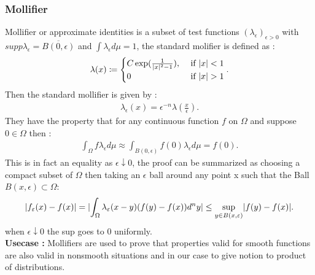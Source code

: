 \subsubsection{Mollifier}
Mollifier or approximate identities is a subset of test functions $(\lambda_{\epsilon })_{\epsilon  > 0}$ with 
$supp \lambda_\epsilon  = \overline{B(0,\epsilon )}$ and $\int  \lambda_\epsilon  d\mu  = 1$, the standard molifier is defined as : 
\begin{align*}
  \lambda(x) \coloneqq  \begin{cases}
    C\exp(\frac{1}{\lvert x\rvert^2-1}), &\text{ if }\lvert x\rvert < 1 \\
    0 &\text{ if } \lvert x\rvert>1
  \end{cases}
.\end{align*}
Then the standard mollifier is given by : 
\begin{align*}
  \lambda_\epsilon(x) = \epsilon ^{-n} \lambda (\frac{x}{\epsilon }) 
.\end{align*}
They have the property that for any continuous function $f$ on $\Omega $ and suppose $0 \in \Omega $ then : 
\begin{align*}
  \int_\Omega  f \lambda_\epsilon  d\mu  \approx \int_{B(0,\epsilon )} f(0)\lambda_\epsilon d\mu  = f(0)
.\end{align*}
This is in fact an equality as $\epsilon  \downarrow 0 $, the proof can be summarized as 
choosing a compact subset of $\Omega $ then taking an $\epsilon $ ball around any point x such that the Ball $B(x,\epsilon ) \subset \Omega $: 
\begin{align*}
  \lvert f_{\varepsilon }(x) - f(x)\rvert = \lvert\int_\Omega  \lambda_\varepsilon (x-y)(f(y)-f(x)) d^{n} y \rvert \le \sup_{y \in  B(x,\varepsilon )} \lvert f(y)-f(x)\rvert   
.\end{align*}
when $\epsilon  \downarrow 0 $ the sup goes to 0 uniformly.\\[1ex]
\textbf{Usecase : } Mollifiers are used to prove  that properties valid for smooth functions are also valid in nonsmooth situations
and in our case to give notion to product of distributions.
